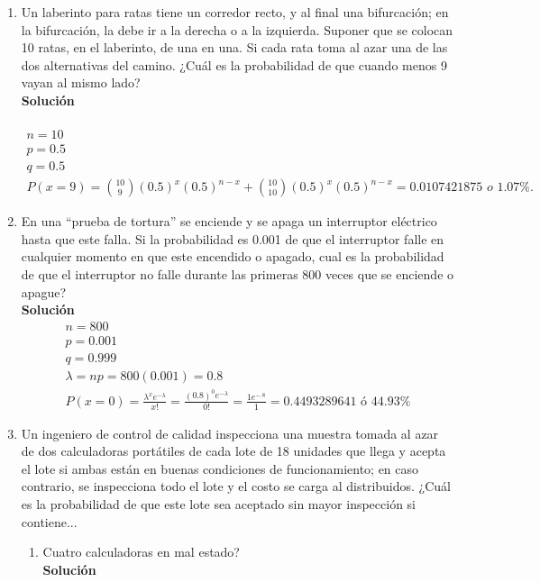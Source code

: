\begin{enumerate}
	\item Un laberinto para ratas tiene un corredor recto, y al final una bifurcación; en la bifurcación, la debe ir a la derecha o a la izquierda. Suponer que se colocan 10 ratas,  en el laberinto, de una en una. Si cada rata toma al azar una de las dos alternativas del camino. ¿Cuál es la probabilidad de que cuando menos 9 vayan al mismo lado?
	\\\textbf{Solución}
	\\ \\
	\begin{gather*}
		n = 10 \\
		p = 0.5 \\
		q = 0.5 \\
		P(x = 9) = \binom{10}{9}(0.5)^x(0.5)^{n-x} + \binom{10}{10}(0.5)^x(0.5)^{n-x} = 0.0107421875 \textit{ o 1.07\%.} 
	\end{gather*}
    \item En una “prueba de tortura” se enciende y se apaga un interruptor eléctrico hasta que este falla. Si la probabilidad es 0.001 de que el interruptor falle en cualquier momento en que este encendido o apagado, cual es la probabilidad de que el interruptor no falle durante las primeras 800 veces que se enciende o apague?
    \\\textbf{Solución}
    \\
    \begin{gather*}
    n=800\\
    p=0.001\\
    q=0.999\\
    \lambda = np = 800(0.001) = 0.8\\
    P(x=0) = \frac{{\lambda}^{x}{e}^{-\lambda}}{x!}= \frac{(0.8)^{0}{e}^{-\lambda}}{0!} = \frac{1{e}^{-.8}}{1} = 0.4493289641 \text{ ó } 44.93\%
    \end{gather*}
    \item Un ingeniero de control de calidad inspecciona una muestra tomada al azar de dos calculadoras portátiles de cada lote de 18 unidades que llega y acepta el lote si ambas están en buenas condiciones de funcionamiento; en caso contrario, se inspecciona todo el lote y el costo se carga al distribuidos. ¿Cuál es la probabilidad de que este lote sea aceptado sin mayor inspección si contiene...
    \begin{enumerate}
        \item Cuatro calculadoras en mal estado?
        \\\textbf{Solución}

\end{enumerate}
\end{enumerate}
